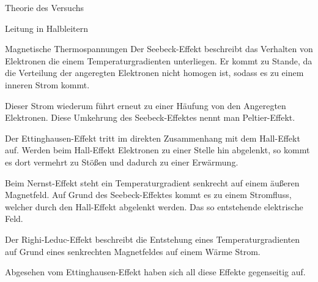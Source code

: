 \documentclass[pdftex, a4paper,11pt, twoside, ngerman]{report}
\begin{document}
\begin{chapter}{Theorie des Versuchs}
\begin{section}{Leitung in Halbleitern}
\begin{subsection}{Magnetische Thermospannungen}
                Der Seebeck-Effekt beschreibt das Verhalten von Elektronen die einem Temperaturgradienten unterliegen. 
                Er kommt zu Stande, da die Verteilung der angeregten Elektronen nicht homogen ist, sodass es zu einem inneren Strom kommt.
                
                Dieser Strom wiederum führt erneut zu einer Häufung von den Angeregten Elektronen.
                Diese Umkehrung des Seebeck-Effektes nennt man Peltier-Effekt.


                Der Ettinghausen-Effekt tritt im direkten Zusammenhang mit dem Hall-Effekt auf.
                Werden beim Hall-Effekt Elektronen zu einer Stelle hin abgelenkt, so kommt es dort vermehrt zu Stößen und dadurch zu einer Erwärmung.
                
                Beim Nernst-Effekt steht ein Temperaturgradient senkrecht auf einem äußeren Magnetfeld.
                Auf Grund des Seebeck-Effektes kommt es zu einem Stromfluss, welcher durch den Hall-Effekt abgelenkt werden.
                Das so entstehende elektrische Feld.


                Der Righi-Leduc-Effekt beschreibt die Entstehung eines Temperaturgradienten auf Grund eines senkrechten Magnetfeldes auf einem Wärme Strom.

                Abgesehen vom Ettinghausen-Effekt haben sich all diese Effekte gegenseitig auf.

        \end{subsection}

    \end{section}
    
    
  \end{chapter}
         
         
         
\end{document}

